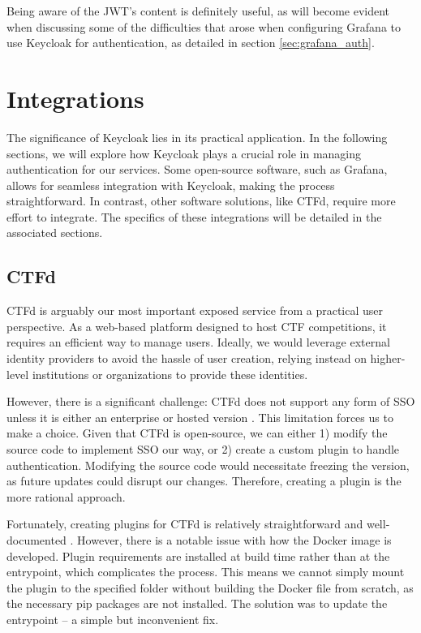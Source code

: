Being aware of the JWT's content is definitely useful, as will become evident when discussing some of the difficulties that arose when configuring Grafana to use Keycloak for authentication, as detailed in section \ref{sec:grafana_auth}.

\section{Integrations}
The significance of Keycloak lies in its practical application. In the following sections, we will explore how Keycloak plays a crucial role in managing authentication for our services. Some open-source software, such as Grafana, allows for seamless integration with Keycloak, making the process straightforward. In contrast, other software solutions, like CTFd, require more effort to integrate. The specifics of these integrations will be detailed in the associated sections.

\subsection{CTFd}
CTFd is arguably our most important exposed service from a practical user perspective. As a web-based platform designed to host CTF competitions, it requires an efficient way to manage users. Ideally, we would leverage external identity providers to avoid the hassle of user creation, relying instead on higher-level institutions or organizations to provide these identities.

However, there is a significant challenge: CTFd does not support any form of SSO unless it is either an enterprise or hosted version \parencite{ctfd_sso}. This limitation forces us to make a choice. Given that CTFd is open-source, we can either 1) modify the source code to implement SSO our way, or 2) create a custom plugin to handle authentication. Modifying the source code would necessitate freezing the version, as future updates could disrupt our changes. Therefore, creating a plugin is the more rational approach.

Fortunately, creating plugins for CTFd is relatively straightforward and well-documented \parencite{ctfd_plugins}. However, there is a notable issue with how the Docker image is developed. Plugin requirements are installed at build time rather than at the entrypoint, which complicates the process. This means we cannot simply mount the plugin to the specified folder without building the Docker file from scratch, as the necessary pip packages are not installed. The solution was to update the entrypoint -- a simple but inconvenient fix.

